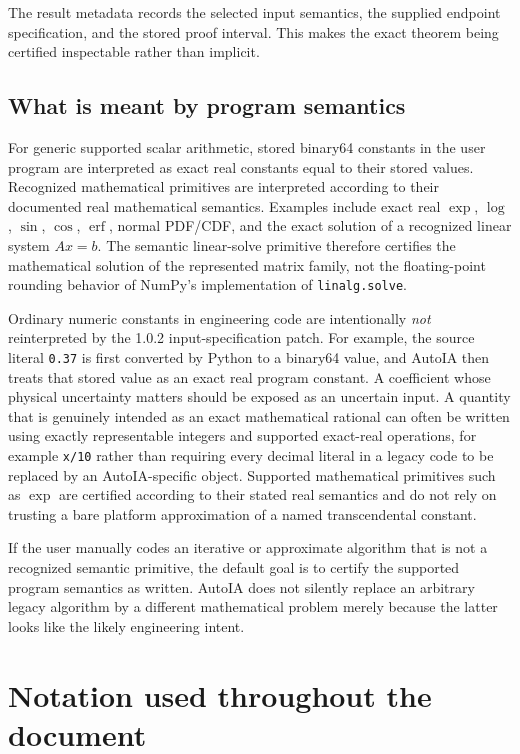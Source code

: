 \documentclass[11pt]{article}
\begin{document}
The result metadata records the selected input semantics, the supplied endpoint
specification, and the stored proof interval.  This makes the exact theorem being
certified inspectable rather than implicit.

\subsection{What is meant by program semantics}

For generic supported scalar arithmetic, stored binary64 constants in the user
program are interpreted as exact real constants equal to their stored values.
Recognized mathematical primitives are interpreted according to their documented
real mathematical semantics.  Examples include exact real \(\exp\), \(\log\),
\(\sin\), \(\cos\), \(\operatorname{erf}\), normal PDF/CDF, and the exact solution
of a recognized linear system \(A x=b\).  The semantic linear-solve primitive
therefore certifies the mathematical solution of the represented matrix family,
not the floating-point rounding behavior of NumPy's implementation of
\texttt{linalg.solve}.

Ordinary numeric constants in engineering code are intentionally \emph{not}
reinterpreted by the 1.0.2 input-specification patch.  For example, the source
literal \texttt{0.37} is first converted by Python to a binary64 value, and AutoIA
then treats that stored value as an exact real program constant.  A coefficient
whose physical uncertainty matters should be exposed as an uncertain input.  A
quantity that is genuinely intended as an exact mathematical rational can often
be written using exactly representable integers and supported exact-real
operations, for example \texttt{x/10} rather than requiring every decimal literal
in a legacy code to be replaced by an AutoIA-specific object.  Supported
mathematical primitives such as \(\exp\) are certified according to their stated
real semantics and do not rely on trusting a bare platform approximation of a
named transcendental constant.

If the user manually codes an iterative or approximate algorithm that is not a
recognized semantic primitive, the default goal is to certify the supported
program semantics as written.  AutoIA does not silently replace an arbitrary
legacy algorithm by a different mathematical problem merely because the latter
looks like the likely engineering intent.

\section{Notation used throughout the document}
\end{document}
